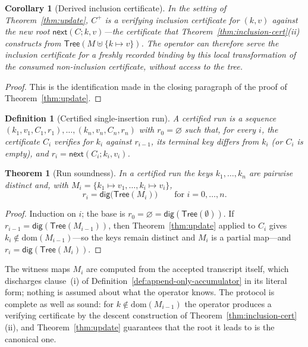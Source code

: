 \documentclass[11pt]{article}
\newtheorem{definition}{Definition}
\newtheorem{theorem}{Theorem}
\newtheorem{corollary}{Corollary}
\begin{document}
\begin{corollary}[Derived inclusion certificate]
\label{cor:derived-cert}
In the setting of Theorem~\ref{thm:update}, $C^{+}$ is a verifying inclusion certificate for $(k,v)$ against the new root $\mathsf{next}(C;k,v)$---the certificate that Theorem~\ref{thm:inclusion-cert}(ii) constructs from $\mathsf{Tree}(M \uplus \{k \mapsto v\})$. The operator can therefore serve the inclusion certificate for a freshly recorded binding by this local transformation of the consumed non-inclusion certificate, without access to the tree.
\end{corollary}
\begin{proof}
This is the identification made in the closing paragraph of the proof of Theorem~\ref{thm:update}.
\end{proof}

\begin{definition}[Certified single-insertion run]
\label{def:run}
A \emph{certified run} is a sequence $(k_1,v_1,C_1,r_1),\allowbreak\ldots,\allowbreak(k_n,v_n,C_n,r_n)$ with $r_0 = \varnothing$ such that, for every $i$, the certificate $C_i$ verifies for $k_i$ against $r_{i-1}$, its terminal key differs from $k_i$ (or $C_i$ is empty), and $r_i = \mathsf{next}(C_i;k_i,v_i)$.
\end{definition}

\begin{theorem}[Run soundness]
\label{thm:run}
In a certified run the keys $k_1,\ldots,k_n$ are pairwise distinct and, with $M_i = \{k_1 \mapsto v_1,\ldots,k_i \mapsto v_i\}$,
\[
  r_i = \mathsf{dig}\bigl(\mathsf{Tree}(M_i)\bigr) \qquad \text{for } i = 0,\ldots,n.
\]
\end{theorem}
\begin{proof}
Induction on $i$; the base is $r_0 = \varnothing = \mathsf{dig}(\mathsf{Tree}(\emptyset))$. If $r_{i-1} = \mathsf{dig}(\mathsf{Tree}(M_{i-1}))$, then Theorem~\ref{thm:update} applied to $C_i$ gives $k_i \notin \mathrm{dom}(M_{i-1})$---so the keys remain distinct and $M_i$ is a partial map---and $r_i = \mathsf{dig}(\mathsf{Tree}(M_i))$.
\end{proof}

The witness maps $M_i$ are computed from the accepted transcript itself, which discharges clause~(i) of Definition~\ref{def:append-only-accumulator} in its literal form; nothing is assumed about what the operator knows. The protocol is complete as well as sound: for $k \notin \mathrm{dom}(M_{i-1})$ the operator produces a verifying certificate by the descent construction of Theorem~\ref{thm:inclusion-cert}(ii), and Theorem~\ref{thm:update} guarantees that the root it leads to is the canonical one.
\end{document}
